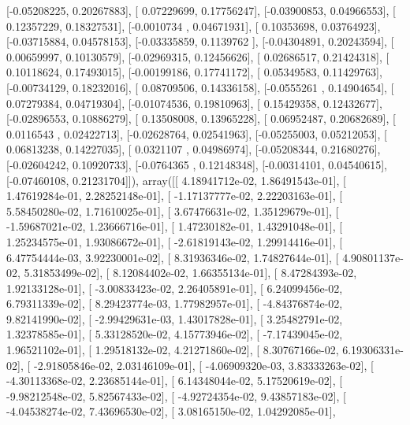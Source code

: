 \documentclass{article}
\begin{document}
       [-0.05208225,  0.20267883],
       [ 0.07229699,  0.17756247],
       [-0.03900853,  0.04966553],
       [ 0.12357229,  0.18327531],
       [-0.0010734 ,  0.04671931],
       [ 0.10353698,  0.03764923],
       [-0.03715884,  0.04578153],
       [-0.03335859,  0.1139762 ],
       [-0.04304891,  0.20243594],
       [ 0.00659997,  0.10130579],
       [-0.02969315,  0.12456626],
       [ 0.02686517,  0.21424318],
       [ 0.10118624,  0.17493015],
       [-0.00199186,  0.17741172],
       [ 0.05349583,  0.11429763],
       [-0.00734129,  0.18232016],
       [ 0.08709506,  0.14336158],
       [-0.0555261 ,  0.14904654],
       [ 0.07279384,  0.04719304],
       [-0.01074536,  0.19810963],
       [ 0.15429358,  0.12432677],
       [-0.02896553,  0.10886279],
       [ 0.13508008,  0.13965228],
       [ 0.06952487,  0.20682689],
       [ 0.0116543 ,  0.02422713],
       [-0.02628764,  0.02541963],
       [-0.05255003,  0.05212053],
       [ 0.06813238,  0.14227035],
       [ 0.0321107 ,  0.04986974],
       [-0.05208344,  0.21680276],
       [-0.02604242,  0.10920733],
       [-0.0764365 ,  0.12148348],
       [-0.00314101,  0.04540615],
       [-0.07460108,  0.21231704]]), array([[  4.18941712e-02,   1.86491543e-01],
       [  1.47619284e-01,   2.28252148e-01],
       [ -1.17137777e-02,   2.22203163e-01],
       [  5.58450280e-02,   1.71610025e-01],
       [  3.67476631e-02,   1.35129679e-01],
       [ -1.59687021e-02,   1.23666716e-01],
       [  1.47230182e-01,   1.43291048e-01],
       [  1.25234575e-01,   1.93086672e-01],
       [ -2.61819143e-02,   1.29914416e-01],
       [  6.47754444e-03,   3.92230001e-02],
       [  8.31936346e-02,   1.74827644e-01],
       [  4.90801137e-02,   5.31853499e-02],
       [  8.12084402e-02,   1.66355134e-01],
       [  8.47284393e-02,   1.92133128e-01],
       [ -3.00833423e-02,   2.26405891e-01],
       [  6.24099456e-02,   6.79311339e-02],
       [  8.29423774e-03,   1.77982957e-01],
       [ -4.84376874e-02,   9.82141990e-02],
       [ -2.99429631e-03,   1.43017828e-01],
       [  3.25482791e-02,   1.32378585e-01],
       [  5.33128520e-02,   4.15773946e-02],
       [ -7.17439045e-02,   1.96521102e-01],
       [  1.29518132e-02,   4.21271860e-02],
       [  8.30767166e-02,   6.19306331e-02],
       [ -2.91805846e-02,   2.03146109e-01],
       [ -4.06909320e-03,   3.83333263e-02],
       [ -4.30113368e-02,   2.23685144e-01],
       [  6.14348044e-02,   5.17520619e-02],
       [ -9.98212548e-02,   5.82567433e-02],
       [ -4.92724354e-02,   9.43857183e-02],
       [ -4.04538274e-02,   7.43696530e-02],
       [  3.08165150e-02,   1.04292085e-01],
\end{document}
